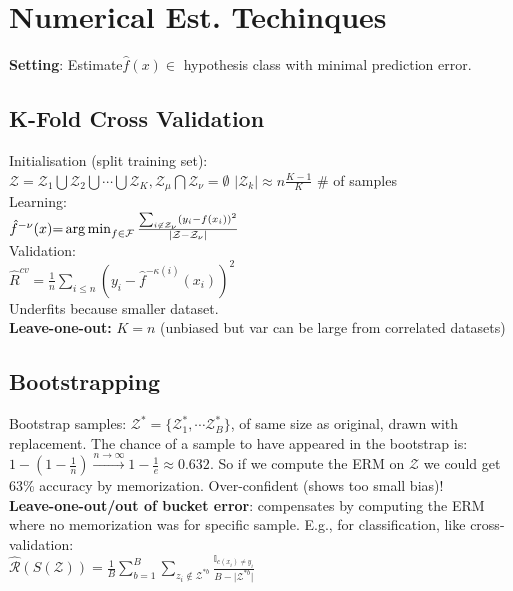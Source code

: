 \section*{Numerical Est. Techinques}
\textbf{Setting}: Estimate$\hat{f}(x) \in $ hypothesis class with minimal prediction error.

\subsection*{K-Fold Cross Validation}
Initialisation (split training set):\\
$\mathcal{Z}=\mathcal{Z}_1\bigcup\mathcal{Z}_2\bigcup\cdots\bigcup\mathcal{Z}_K, \mathcal{Z}_\mu \bigcap\mathcal{Z}_\nu = \emptyset $
$|\mathcal{Z}_k|\approx n\frac{K-1}{K}$ \# of samples\\
Learning:\\
$\hat{f}^{-\nu}(x){=}
\operatorname*{arg\,min}_{f\in\mathcal{F}}\frac{\sum_{i\not\in\mathcal{Z}_\nu}(y_i-f(x_i))^2}{|\mathcal{Z}-\mathcal{Z}_{\nu}|}$\\
Validation:\\
$\hat{R}^{cv} = \frac{1}{n}\sum_{i\leq n}(y_i-\hat{f}^{-\kappa(i)}(x_i))^2$\\
Underfits because smaller dataset.\\
\textbf{Leave-one-out:} $K=n$ (unbiased but var can be large from correlated datasets)
\subsection*{Bootstrapping}
Bootstrap samples: $\mathcal{Z}^*=\{\mathcal{Z}_1^*, \cdots\mathcal{Z}_B^*\}$, of same size as original, drawn with replacement.
The chance of a sample to have appeared in the bootstrap is:\\
$1-(1-\frac{1}{n})\stackrel{n\to\infty}{\to} 1-\frac{1}{e}\approx 0.632$. So if we compute the ERM on $\mathcal{Z}$ we could get 63\% accuracy by memorization. Over-confident (shows too small bias)!\\
\textbf{Leave-one-out/out of bucket error}: compensates by computing the ERM where no memorization was for specific sample. E.g., for classification, like cross-validation:\\
$\hat{\mathcal{R}}(S(\mathcal{Z}))=\frac{1}{B}\sum_{b=1}^B\sum_{z_i\not\in\mathcal{Z}^{*b}}\frac{\mathbb{I}_{c(x_i)\neq y_i}}{B-\lvert\mathcal{Z}^{*b}\rvert}$


